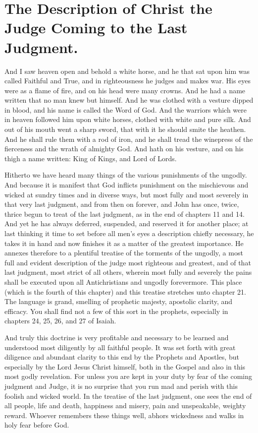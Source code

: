 \chapter[Sermon 85. The Description of Christ the Judge Coming to the Last Judgment.]{The Description of Christ the Judge Coming to the Last Judgment.}
\label{sermon:085}

And I saw heaven open and behold a white horse, and he that sat upon him was called Faithful and True, and in righteousness he judges and makes war. His eyes were as a flame of fire, and on his head were many crowns. And he had a name written that no man knew but himself. And he was clothed with a vesture dipped in blood, and his name is called the Word of God. And the warriors which were in heaven followed him upon white horses, clothed with white and pure silk. And out of his mouth went a sharp sword, that with it he should smite the heathen. And he shall rule them with a rod of iron, and he shall tread the winepress of the fierceness and the wrath of almighty God. And hath on his vesture, and on his thigh a name written: King of Kings, and Lord of Lords.

Hitherto we have heard many things of the various punishments of the ungodly. And because it is manifest that God inflicts punishment on the mischievous and wicked at sundry times and in diverse ways, but most fully and most severely in that very last judgment, and from then on forever, and John has once, twice, thrice begun to treat of the last judgment, as in the end of chapters 11 and 14. And yet he has always deferred, suspended, and reserved it for another place; at last thinking it time to set before all men's eyes a description chiefly necessary, he takes it in hand and now finishes it as a matter of the greatest importance. He annexes therefore to a plentiful treatise of the torments of the ungodly, a most full and evident description of the judge most righteous and greatest, and of that last judgment, most strict of all others, wherein most fully and severely the pains shall be executed upon all Antichristians and ungodly forevermore. This place (which is the fourth of this chapter) and this treatise stretches unto chapter 21. The language is grand, smelling of prophetic majesty, apostolic clarity, and efficacy. You shall find not a few of this sort in the prophets, especially in chapters 24, 25, 26, and 27 of Isaiah.

And truly this doctrine is very profitable and necessary to be learned and understood most diligently by all faithful people. It was set forth with great diligence and abundant clarity to this end by the Prophets and Apostles, but especially by the Lord Jesus Christ himself, both in the Gospel and also in this most godly revelation. For unless you are kept in your duty by fear of the coming judgment and Judge, it is no surprise that you run mad and perish with this foolish and wicked world. In the treatise of the last judgment, one sees the end of all people, life and death, happiness and misery, pain and unspeakable, weighty reward. Whoever remembers these things well, abhors wickedness and walks in holy fear before God.

